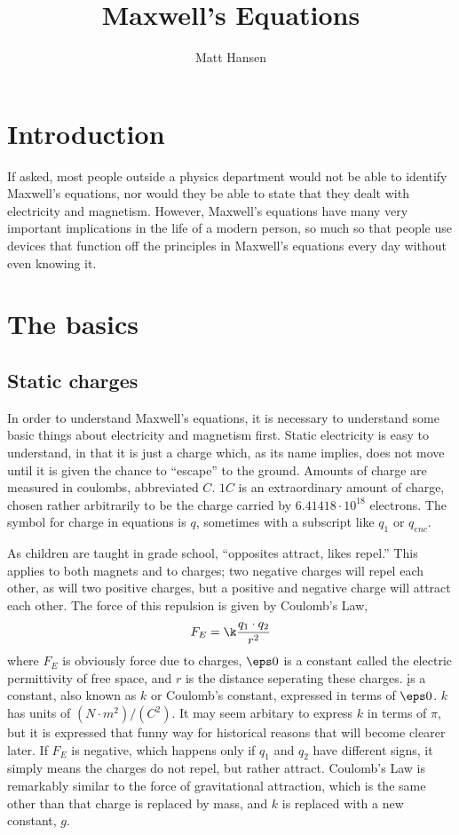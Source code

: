 \documentclass[12pt]{article}
\title{Maxwell's Equations}
\author{Matt Hansen}
\begin{document}
\maketitle
\newpage
\tableofcontents
\newpage
\section{Introduction}
\indent If asked, most people outside a physics department would not be able to identify Maxwell's equations, nor would they be able to state that they dealt with electricity and magnetism. However, Maxwell's equations have many very important implications in the life of a modern person, so much so that people use devices that function off the principles in Maxwell's equations every day without even knowing it.
\section{The basics}

\subsection{Static charges}

\indent In order to understand Maxwell's equations, it is necessary to understand some basic things about electricity and magnetism first. Static electricity is easy to understand, in that it is just a charge which, as its name implies, does not move until it is given the chance to ``escape'' to the ground. Amounts of charge are measured in coulombs, abbreviated $C$. $1C$ is an extraordinary amount of charge, chosen rather arbitrarily to be the charge carried by $6.41418\cdot 10^{18}$ electrons. The symbol for charge in equations is $q$, sometimes with a subscript like $q_1$ or $q_{enc}$.

As children are taught in grade school, ``opposites attract, likes repel.'' This applies to both magnets and to charges; two negative charges will repel each other, as will two positive charges, but a positive and negative charge will attract each other. The force of this repulsion is given by Coulomb's Law,
\begin{equation}
\displaystyle F_E = \k \frac{q_1\cdot q_2}{r^2}
\end{equation}
where $F_E$ is obviously force due to charges, $\eps0$ is a constant called the electric permittivity of free space, and $r$ is the distance seperating these charges. \k is a constant, also known as $k$ or Coulomb's constant, expressed in terms of $\eps0$. $k$ has units of $\left(N\cdot m^2\right)/\left(C^2\right)$. It may seem arbitary to express $k$ in terms of $\pi$, but it is expressed that funny way for historical reasons that will become clearer later. If $F_E$ is negative, which happens only if $q_1$ and $q_2$ have different signs, it simply means the charges do not repel, but rather attract. Coulomb's Law is remarkably similar to the force of gravitational attraction, which is the same other than that charge is replaced by mass, and $k$ is replaced with a new constant, $g$.
\end{document}
